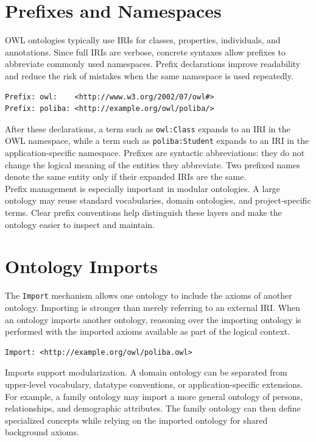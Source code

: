 \documentclass{scrbook}
\begin{document}
	\section{Prefixes and Namespaces}
	
	OWL ontologies typically use IRIs for classes, properties, individuals, and annotations. Since full IRIs are verbose, concrete syntaxes allow prefixes to abbreviate commonly used namespaces. Prefix declarations improve readability and reduce the risk of mistakes when the same namespace is used repeatedly.
	
	\begin{lstlisting}
Prefix: owl:    <http://www.w3.org/2002/07/owl#>
Prefix: poliba: <http://example.org/owl/poliba/>
	\end{lstlisting}
	
	After these declarations, a term such as \texttt{owl:Class} expands to an IRI in the OWL namespace, while a term such as \texttt{poliba:Student} expands to an IRI in the application-specific namespace. Prefixes are syntactic abbreviations: they do not change the logical meaning of the entities they abbreviate. Two prefixed names denote the same entity only if their expanded IRIs are the same.\\
	
	Prefix management is especially important in modular ontologies. A large ontology may reuse standard vocabularies, domain ontologies, and project-specific terms. Clear prefix conventions help distinguish these layers and make the ontology easier to inspect and maintain.
	
	\section{Ontology Imports}
	
	The \texttt{Import} mechanism allows one ontology to include the axioms of another ontology. Importing is stronger than merely referring to an external IRI. When an ontology imports another ontology, reasoning over the importing ontology is performed with the imported axioms available as part of the logical context.
	
	\begin{lstlisting}
Import: <http://example.org/owl/poliba.owl>
	\end{lstlisting}
	
	Imports support modularization. A domain ontology can be separated from upper-level vocabulary, datatype conventions, or application-specific extensions. For example, a family ontology may import a more general ontology of persons, relationships, and demographic attributes. The family ontology can then define specialized concepts while relying on the imported ontology for shared background axioms.\\
	
\end{document}
